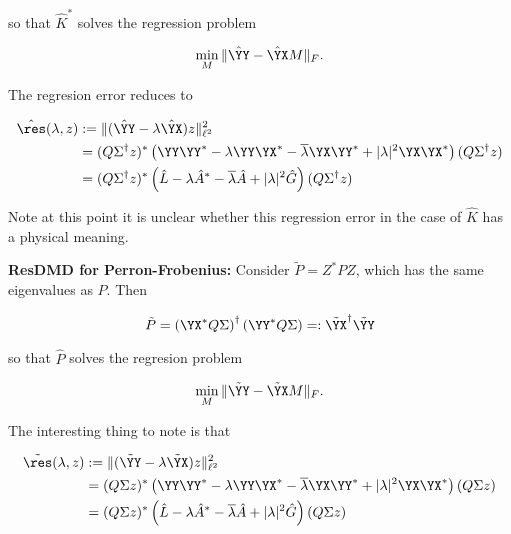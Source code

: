 so that $\hat{K}^*$ solves the regression problem

\begin{equation}
    \min_M \| \hat{\YY} - \hat{\YX} M \|_F . 
\end{equation}

The regresion error reduces to

\begin{align}
    \hat{\res} (\lambda, z) 
    &:= \| ( \hat{\YY} - \lambda \hat{\YX} ) z \|_{\ell^2}^2 \\
    &= (Q \Sigma^\dagger z)^* \left( 
        \YY \YY^* 
        - \lambda \YY \YX^* 
        - \overline{\lambda} \YX \YY^* 
        + | \lambda |^2 \YX \YX^*
    \right) (Q \Sigma^\dagger z) \\
    &= (Q \Sigma^\dagger z)^* \left( 
        \hat{L}
        - \lambda \hat{A}^*
        - \overline{\lambda} \hat{A}
        + | \lambda |^2 \hat{G}
    \right) (Q \Sigma^\dagger z)
\end{align}

Note at this point it is unclear whether this regression error in the case of $\hat{K}$ 
has a physical meaning. 

\textbf{ResDMD for Perron-Frobenius:} Consider $\tilde{P} = Z^* P Z$, which has the same 
eigenvalues as $P$. Then 

\begin{equation}
    \tilde{P} = \left( \YX^* Q \Sigma \right)^\dagger \left( \YY^* Q \Sigma \right) =:
    \tilde{\YX}^\dagger \tilde{\YY}
\end{equation}

so that $\hat{P}$ solves the regresion problem

\begin{equation}
    \min_M \| \tilde{\YY} - \tilde{\YX} M \|_F . 
\end{equation}

The interesting thing to note is that 

\begin{align}
    \tilde{\res} (\lambda, z)
    &:= \| ( \tilde{\YY} - \lambda \tilde{\YX} ) z \|_{\ell^2}^2 \\
    &= (Q \Sigma z)^* \left( 
        \YY \YY^* 
        - \lambda \YY \YX^* 
        - \overline{\lambda} \YX \YY^* 
        + | \lambda |^2 \YX \YX^*
    \right) (Q \Sigma z) \\
    &= (Q \Sigma z)^* \left( 
        \hat{L}
        - \lambda \hat{A}^*
        - \overline{\lambda} \hat{A}
        + | \lambda |^2 \hat{G}
    \right) (Q \Sigma z)
\end{align}

